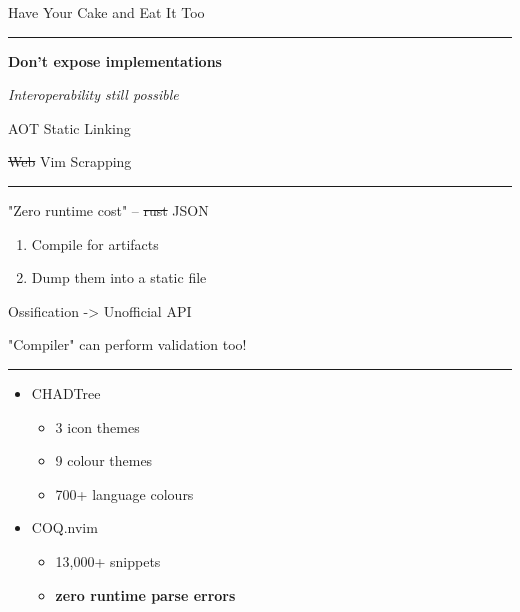 \documentclass{beamer}
\begin{document}
\begin{frame}[standout]

	Have Your Cake and Eat It Too

	\rule{\textwidth}{0.1em}

	\textbf{Don't expose implementations}

	\textit{Interoperability still possible}

\end{frame}


\begin{frame}{AOT Static Linking}

	\st{Web} Vim Scrapping

	\rule{\textwidth}{0.1em}

	"Zero runtime cost" -- \st{rust} JSON

	\begin{enumerate}

		\item Compile  for artifacts

		\item Dump them into a static file

	\end{enumerate}

\end{frame}


\begin{frame}{Ossification -> Unofficial API}

	"Compiler" can perform validation too!

	\rule{\textwidth}{0.1em}

	\begin{itemize}

		\item CHADTree

		      \begin{itemize}

			      \item 3 icon themes

			      \item 9 colour themes

			      \item 700+ language colours

		      \end{itemize}

		\item COQ.nvim

		      \begin{itemize}

			      \item 13,000+ snippets

			      \item \textbf{zero runtime parse errors}

		      \end{itemize}

	\end{itemize}

\end{frame}
\end{document}
